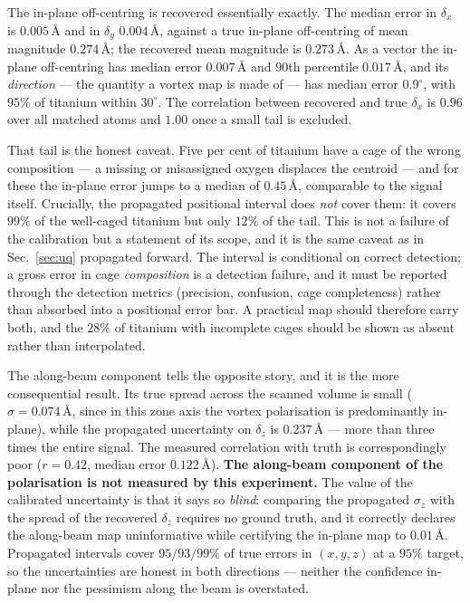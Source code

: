\documentclass[aps,prb,twocolumn,superscriptaddress,floatfix,nofootinbib]{revtex4-2}
\begin{document}
The in-plane off-centring is recovered essentially exactly. The median error in
$\delta_x$ is $0.005$\,\AA{} and in $\delta_y$ $0.004$\,\AA{}, against a true in-plane
off-centring of mean magnitude $0.274$\,\AA; the recovered mean magnitude is $0.273$\,\AA. As a
vector the in-plane off-centring has median error $0.007$\,\AA{} and $90$th percentile
$0.017$\,\AA, and its \emph{direction} --- the quantity a vortex map is made of --- has median
error $0.9^\circ$, with $95\%$ of titanium within $30^\circ$. The correlation between recovered
and true $\delta_x$ is $0.96$ over all matched atoms and $1.00$ once a small tail is excluded.

That tail is the honest caveat. Five per cent of titanium have a cage of the wrong composition
--- a missing or misassigned oxygen displaces the centroid --- and for these the in-plane error
jumps to a median of $0.45$\,\AA, comparable to the signal itself. Crucially, the propagated
positional interval does \emph{not} cover them: it covers $99\%$ of the well-caged titanium but
only $12\%$ of the tail. This is not a failure of the calibration but a statement of its scope,
and it is the same caveat as in Sec.~\ref{sec:uq} propagated forward. The interval is
conditional on correct detection; a gross error in cage \emph{composition} is a detection
failure, and it must be reported through the detection metrics (precision, confusion, cage
completeness) rather than absorbed into a positional error bar. A practical map should therefore
carry both, and the $28\%$ of titanium with incomplete cages should be shown as absent rather
than interpolated.

The along-beam component tells the opposite story, and it is the more consequential result. Its
true spread across the scanned volume is small ($\sigma=0.074$\,\AA, since in this zone axis the
vortex polarisation is predominantly in-plane), while the propagated uncertainty on $\delta_z$
is $0.237$\,\AA{} --- more than three times the entire signal. The measured correlation with
truth is correspondingly poor ($r=0.42$, median error $0.122$\,\AA). \textbf{The along-beam
component of the polarisation is not measured by this experiment.} The value of the calibrated
uncertainty is that it says so \emph{blind}: comparing the propagated $\sigma_z$ with the spread
of the recovered $\delta_z$ requires no ground truth, and it correctly declares the along-beam
map uninformative while certifying the in-plane map to $0.01$\,\AA. Propagated intervals cover
$95/93/99\%$ of true errors in $(x,y,z)$ at a $95\%$ target, so the uncertainties are honest in
both directions --- neither the confidence in-plane nor the pessimism along the beam is
overstated.
\end{document}
